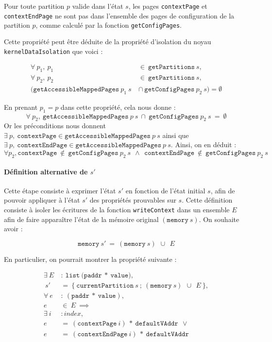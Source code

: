 			\begin{property}
				Pour toute partition $p$ valide dans l'état $s$, les pages \texttt{contextPage} et \texttt{contextEndPage} ne sont pas dans l'ensemble des pages de configuration de la partition $p$, comme calculé par la fonction \texttt{getConfigPages}.
			\label{prop:pagesnotconfig}
			\end{property}

			Cette propriété peut être déduite de la propriété d'isolation du noyau \texttt{kernelDataIsolation} que voici :

			\begin{align*}
				\forall~p_1,~p_1~&\in~\mathtt{getPartitions}~s,\\
				\forall~p_2,~p_2~&\in~\mathtt{getPartitions}~s,\\
				(\mathtt{getAccessibleMappedPages}~p_1~s~&\cap~\mathtt{getConfigPages}~p_2~s) = \emptyset
			\end{align*}

			En prenant $p_1 = p$ dans cette propriété, cela nous donne : 
			$$\forall~p_2,~\mathtt{getAccessibleMappedPages}~p~s~\cap~\mathtt{getConfigPages}~p_2~s~=~\emptyset$$
			Or les préconditions nous donnent $\exists~p,~\mathtt{contextPage} \in \mathtt{getAccessibleMappedPages}~p~s$ ainsi que $\exists~p,~\mathtt{contextEndPage} \in \mathtt{getAccessibleMappedPages}~p~s$. Ainsi, on en déduit :
			$$\forall p_2, \mathtt{contextPage}~\notin~\mathtt{getConfigPages}~p_2~s~~\wedge~~\mathtt{contextEndPage}~\notin~\mathtt{getConfigPages}~p_2~s$$


			\paragraph{Définition alternative de $s'$} Cette étape consiste à exprimer l'état $s'$ en fonction de l'état initial $s$, afin de pouvoir appliquer à l'état $s'$ des propriétés prouvables sur $s$. Cette définition consiste à isoler les écritures de la fonction \texttt{writeContext} dans un ensemble $E$ afin de faire apparaître l'état de la mémoire original $(\mathtt{memory}~s)$.
			On souhaite avoir :

			$$\mathtt{memory}~s'~=~(\mathtt{memory}~s)~~\cup~~E$$

			En particulier, on pourrait montrer la propriété suivante :

			\begin{align*}
				\exists~E~&:~\mathtt{list}~(\mathtt{paddr}~*~\mathtt{value)},\\
				      ~s'~&=~\mathtt{\{~currentPartition}~s~;~(\mathtt{memory}~s)~~\cup~~E~\mathtt{\}},\\
				\forall~e~&:~(\mathtt{paddr}~*~\mathtt{value}),\\
				        e~&\in~E~\implies\\
				\exists~i~&: index,\\
				        e~&=~(\mathtt{contextPage}~i)~*~\mathtt{defaultVAddr}~~\lor\\
				        e~&=~(\mathtt{contextEndPage}~i)~*~\mathtt{defaultVAddr}
			\end{align*}

